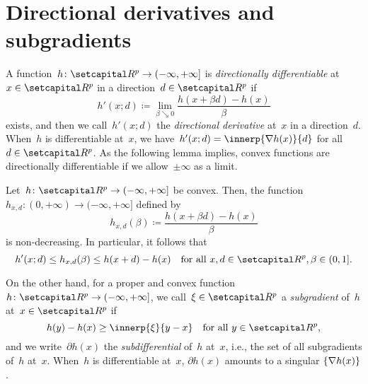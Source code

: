 \documentclass[../main]{subfiles}
\begin{document}
\section{Directional derivatives and subgradients}
A function~$h \colon \setR^p \to (-\infty, +\infty]$ is \emph{directionally differentiable} at~$x \in \setR^p$ in a direction~$d \in \setR^p$ if
\begin{equation} \label{eq:dir_deriv}
    h'(x; d) \coloneqq \lim_{\beta \searrow 0} \frac{h(x + \beta d) - h(x)}{\beta}
\end{equation} 
exists, and then we call~$h'(x; d)$ the \emph{directional derivative} at~$x$ in a direction~$d$.
When~$h$ is differentiable at~$x$, we have~$h'(x; d) = \innerp{\nabla h(x)}{d}$ for all~$d \in \setR^p$.
As the following lemma implies, convex functions are directionally differentiable if we allow~$\pm \infty$ as a limit.
\begin{lemma} 
    Let~$h \colon \setR^p \to (-\infty, +\infty]$ be convex.
    Then, the function~$h_{x, d} \colon (0, +\infty) \to (-\infty, +\infty]$ defined by
    \begin{equation}
        h_{x, d}(\beta) \coloneqq \frac{h(x + \beta d) - h(x)}{\beta}
    \end{equation} 
    is non-decreasing.
    In particular, it follows that
    \begin{equation}
        h'(x; d) \le h_{x, d}(\beta) \le h(x + d) - h(x) \forallcondition{x, d \in \setR^p, \beta \in (0, 1]}
    .\end{equation} 
\end{lemma}
On the other hand, for a proper and convex function~$h \colon \setR^p \to (-\infty, +\infty]$, we call~$\xi \in \setR^p$ a \emph{subgradient} of~$h$ at~$x \in \setR^p$ if
\begin{equation} \label{eq:subgrad}
    h(y) - h(x) \ge \innerp{\xi}{y - x} \forallcondition{y \in \setR^p}
,\end{equation} 
and we write~$\partial h(x)$ the \emph{subdifferential} of~$h$ at~$x$, i.e., the set of all subgradients of~$h$ at~$x$.
When~$h$ is differentiable at~$x$, $\partial h(x)$ amounts to a singular $\lbrace\nabla h(x)\rbrace$.
\end{document}
